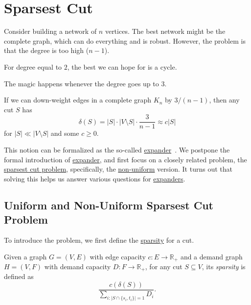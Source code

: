 \section{Sparsest Cut}
Consider building a network of \(n\) vertices. The best network might be the complete graph, which can do everything and is robust. However, the problem is that the degree is too high (\(n-1\)).

\begin{eg}
	For degree equal to \(2\), the best we can hope for is a cycle.
\end{eg}

The magic happens whenever the degree goes up to \(3\).

\begin{intuition}
	If we can down-weight edges in a complete graph \(K_n\) by \(3 / (n-1)\), then any cut \(S\) has
	\[
		\delta (S)
		= \lvert S \rvert \cdot \lvert V \setminus S \rvert \cdot \frac{3}{n-1}
		\approx c \lvert S \rvert
	\]
	for \(\lvert S \rvert \ll \lvert V \setminus S \rvert \) and some \(c \geq 0 \).
\end{intuition}

This notion can be formalized as the so-called \hyperref[def:expander]{expander}~\cite{hoory2006expander}. We postpone the formal introduction of \hyperref[def:expander]{expander}, and first focus on a closely related problem, the \hyperref[prb:sparsest-cut]{sparsest cut problem}, specifically, the \hyperref[prb:non-uniform-sparsest-cut]{non-uniform} version. It turns out that solving this helps us answer various questions for \hyperref[def:expander]{expanders}.

\subsection{Uniform and Non-Uniform Sparsest Cut Problem}
To introduce the problem, we first define the \hyperref[def:sparsity]{sparsity} for a cut.

\begin{definition}[Sparsity]\label{def:sparsity}
	Given a graph \(G = (V, E)\) with edge capacity \(c \colon E \to \mathbb{R} _+\) and a demand graph \(H = (V, F)\) with demand capacity \(D \colon F \to \mathbb{R} _+\), for any cut \(S \subseteq V\), its \emph{sparsity} is defined as
	\[
		\frac{c(\delta (S))}{\sum_{i \colon \lvert S \cap \{ s_i, t_i \} \rvert = 1} D_i}.
	\]
\end{definition}

